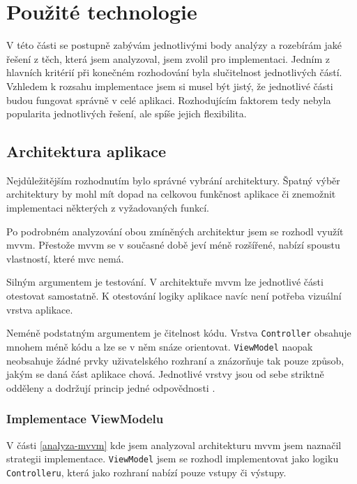 \section{Použité technologie}

V této části se postupně zabývám jednotlivými body analýzy a rozebírám jaké řešení z těch, která jsem analyzoval, jsem zvolil pro implementaci.
Jedním z hlavních kritérií při konečném rozhodování byla slučitelnost jednotlivých částí.
Vzhledem k rozsahu implementace jsem si musel být jistý, že jednotlivé části budou fungovat správně v celé aplikaci.
Rozhodujícím faktorem tedy nebyla popularita jednotlivých řešení, ale spíše jejich flexibilita.

\subsection{Architektura aplikace}\label{technologie-architektura}

Nejdůležitějším rozhodnutím bylo správné vybrání architektury.
Špatný výběr architektury by mohl mít dopad na celkovou funkčnost aplikace či znemožnit implementaci některých z vyžadovaných funkcí.

Po podrobném analyzování obou zmíněných architektur jsem se rozhodl využít \acrshort{mvvm}.
Přestože \acrshort{mvvm} se v současné době jeví méně rozšířené, nabízí spoustu vlastností, které \acrshort{mvc} nemá.

Silným argumentem je testování.
V architektuře \acrshort{mvvm} lze jednotlivé části otestovat samostatně.
K otestování logiky aplikace navíc není potřeba vizuální vrstva aplikace.

Neméně podstatným argumentem je čitelnost kódu.
Vrstva \texttt{Controller} obsahuje mnohem méně kódu a lze se v něm snáze orientovat.
\texttt{ViewModel} naopak neobsahuje žádné prvky uživatelského rozhraní a znázorňuje tak pouze způsob, jakým se daná část aplikace chová.
Jednotlivé vrstvy jsou od sebe striktně odděleny a dodržují princip jedné odpovědnosti \cite{toptal-srp}.

\subsubsection*{Implementace ViewModelu}

V části \ref{analyza-mvvm} kde jsem analyzoval architekturu \acrshort{mvvm} jsem naznačil strategii implementace.
\texttt{ViewModel} jsem se rozhodl implementovat jako logiku \texttt{Controlleru}, která jako rozhraní nabízí pouze vstupy či výstupy.


